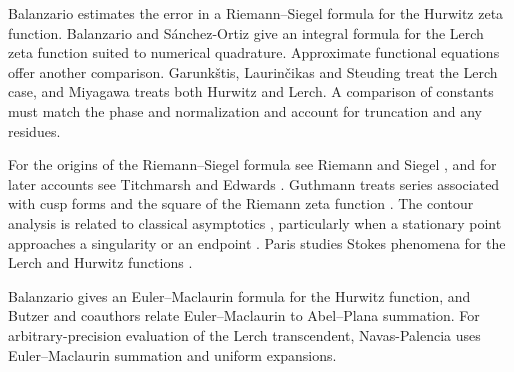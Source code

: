 \documentclass[11pt,a4paper]{article}
\begin{document}
Balanzario \cite{Balanzario2004} estimates the error in a Riemann--Siegel
formula for the Hurwitz zeta function. Balanzario and Sánchez-Ortiz
\cite{BalanzarioSanchez2012} give an integral formula for the Lerch zeta
function suited to numerical quadrature. Approximate functional equations
offer another comparison. Garunkštis, Laurinčikas and Steuding
\cite{GarunkstisLaurincikasSteuding2003} treat the Lerch case, and Miyagawa
\cite{Miyagawa2017} treats both Hurwitz and Lerch. A comparison of constants
must match the phase and normalization and account for truncation and any
residues.

For the origins of the Riemann--Siegel formula see Riemann and Siegel
\cite{Riemann1859,Siegel1932}, and for later accounts see Titchmarsh
and Edwards \cite{Titchmarsh1986,Edwards1974}. Guthmann treats series
associated with cusp forms \cite{GuthmannCusp1997} and the square of the
Riemann zeta function \cite{GuthmannSquare1997}. The contour analysis
is related to classical asymptotics \cite{Olver1997}, particularly when a
stationary point approaches a singularity \cite{Bleistein1966} or an
endpoint \cite{FernandezSpenceFokas2018}. Paris studies Stokes phenomena
for the Lerch and Hurwitz functions \cite{Paris2016,ParisHurwitz2005}.

Balanzario \cite{Balanzario2006} gives an Euler--Maclaurin formula for the
Hurwitz function, and Butzer and coauthors \cite{ButzerEtAl2011} relate
Euler--Maclaurin to Abel--Plana summation. For arbitrary-precision evaluation
of the Lerch transcendent, Navas-Palencia \cite{NavasPalencia2023} uses
Euler--Maclaurin summation and uniform expansions.
\end{document}
